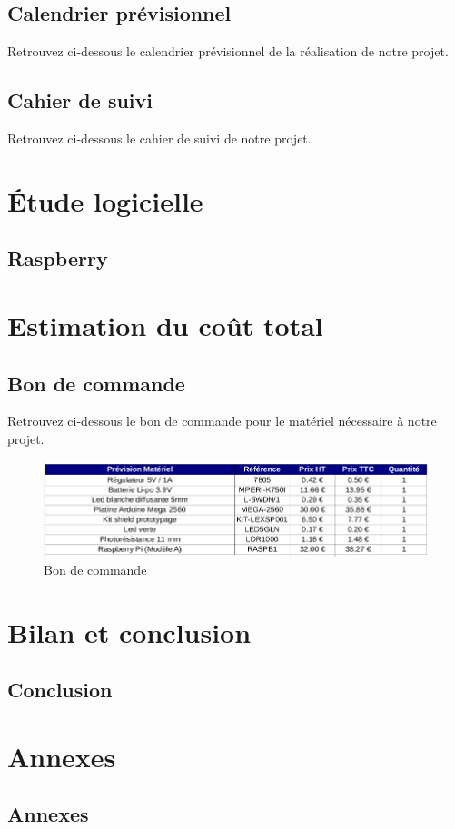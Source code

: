 \documentclass[12pt,titlepage,a4paper]{report}
\begin{document}
	\chapter{Calendrier prévisionnel}
	Retrouvez ci-dessous le calendrier prévisionnel de la réalisation de notre projet.
	
	
	\chapter{Cahier de suivi}
	\minitoc
	Retrouvez ci-dessous le cahier de suivi de notre projet.
	


	\part{Étude logicielle}
	\chapter{Raspberry}
	\minitoc
	


	\part{Estimation du coût total}
	\chapter{Bon de commande}
	Retrouvez ci-dessous le bon de commande pour le matériel nécessaire à notre projet.
	\begin{figure}[h]
		\centering
		\includegraphics[width=550px]{images/lextronic.png}
		\caption{Bon de commande}
	\end{figure}


	\part{Bilan et conclusion}
	\chapter{Conclusion}
	


	\part{Annexes}
	\chapter{Annexes}
	
\end{document}

